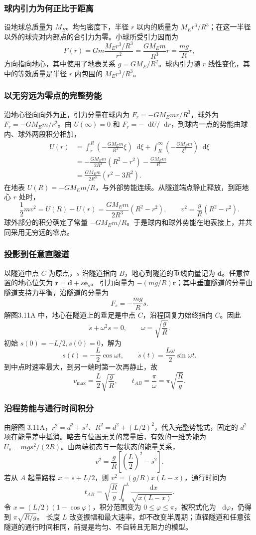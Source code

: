 \documentclass[UTF8,fontset=fandol,a4paper,11pt]{ctexart}
\newcommand{\dd}{\mathop{}\!\mathrm{d}}
\newcommand{\vect}[1]{\bm{#1}}
\begin{document}
\subsubsection*{球内引力为何正比于距离}
设地球总质量为 $M_E$。均匀密度下，半径 $r$ 以内的质量为 $M_Er^3/R^3$；在这一半径以外的球壳对内部点的合引力为零。小球所受引力因而为
\[
F(r)=Gm\frac{M_Er^3/R^3}{r^2}
=\frac{GM_Em}{R^3}r=\frac{mg}{R}r,
\]
方向指向地心，其中使用了地表关系 $g=GM_E/R^2$。球内引力随 $r$ 线性变化，其中的等效质量是半径 $r$ 内包围的 $M_Er^3/R^3$。

\subsubsection*{以无穷远为零点的完整势能}
沿地心径向向外为正，引力分量在球内为 $F_r=-GM_Emr/R^3$，球外为 $F_r=-GM_Em/r^2$。由 $U(\infty)=0$ 和 $F_r=-\dd U/\dd r$，到球内一点的势能由球内、球外两段积分相加，
\[
\begin{aligned}
U(r)&=\int_r^R\left(-\frac{GM_Em}{R^3}\xi\right)\dd\xi
 +\int_R^\infty\left(-\frac{GM_Em}{\xi^2}\right)\dd\xi\\
&=-\frac{GM_Em}{2R^3}(R^2-r^2)-\frac{GM_Em}{R}\\
&=\frac{GM_Em}{2R^3}(r^2-3R^2).
\end{aligned}
\]
在地表 $U(R)=-GM_Em/R$，与外部势能连续。从隧道端点静止释放，到距地心 $r$ 处时，
\[
\frac12mv^2=U(R)-U(r)
=\frac{GM_Em}{2R^3}(R^2-r^2),\qquad
v^2=\frac gR(R^2-r^2).
\]
球外部分的积分确定了常量 $-GM_Em/R$。于是球内和球外势能在地表接上，并共同采用无穷远的零点。

\subsubsection*{投影到任意直隧道}
以隧道中点 $C$ 为原点，$s$ 沿隧道指向 $B$，地心到隧道的垂线向量记为 $\vect d$。任意位置的地心位矢为 $\vect r=\vect d+s\vect e_s$。
引力向量为 $-(mg/R)\vect r$；其中垂直隧道的分量由隧道支持力平衡，沿隧道的分量为
\[
F_s=-\frac{mg}{R}s.
\]
解图3.11A 中，地心在隧道上的垂足是中点 $C$，沿程回复力始终指向 $C$。因此
\[
\ddot s+\omega^2s=0,\qquad \omega=\sqrt{\frac gR}.
\]
初始 $s(0)=-L/2,\dot s(0)=0$，解为
\[
s(t)=-\frac L2\cos\omega t,\qquad
\dot s(t)=\frac{L\omega}{2}\sin\omega t.
\]
到中点时速率最大，到另一端时第一次再静止，故
\[
\boxed{v_{\max}=\frac L2\sqrt{\frac gR}},\qquad
\boxed{t_{AB}=\frac{\pi}{\omega}=\pi\sqrt{\frac Rg}}.
\]

\subsubsection*{沿程势能与通行时间积分}
由解图 3.11A，$r^2=d^2+s^2$、$R^2=d^2+(L/2)^2$，代入完整势能式，固定的 $d^2$ 项在能量差中抵消。略去与位置无关的常量后，有效的一维势能为 $U_s=mgs^2/(2R)$。由两端初态与一般状态的能量关系，
\[
v^2=\frac gR\left[\left(\frac L2\right)^2-s^2\right].
\]
若从 $A$ 起量路程 $x=s+L/2$，则 $v^2=(g/R)x(L-x)$，通行时间为
\[
t_{AB}=\sqrt{\frac Rg}\int_0^L\frac{\dd x}{\sqrt{x(L-x)}}.
\]
令 $x=(L/2)(1-\cos\varphi)$，积分范围变为 $0\leq\varphi\leq\pi$，被积式化为 $\dd\varphi$，仍得到 $\pi\sqrt{R/g}$。
长度 $L$ 改变振幅和最大速率，却不改变半周期；直径隧道和任意弦隧道的通行时间相同，前提是均匀、不自转且无阻力的模型。
\end{document}
